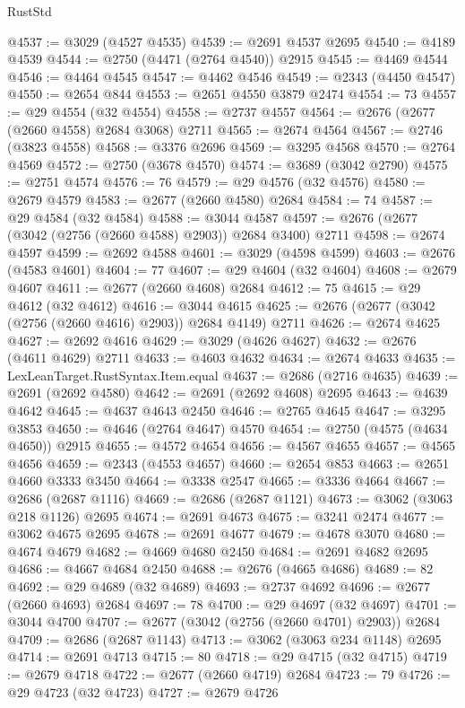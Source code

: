 \begin{lexlean}{RustStd}
\begin{coremodule}
@4537 := @3029 (@4527 @4535)
@4539 := @2691 @4537 @2695
@4540 := @4189 @4539
@4544 := @2750 (@4471 (@2764 @4540)) @2915
@4545 := @4469 @4544
@4546 := @4464 @4545
@4547 := @4462 @4546
@4549 := @2343 (@4450 @4547)
@4550 := @2654 @844
@4553 := @2651 @4550 @3879 @2474
@4554 := 73
@4557 := @29 @4554 (@32 @4554)
@4558 := @2737 @4557
@4564 := @2676 (@2677 (@2660 @4558) @2684 @3068) @2711
@4565 := @2674 @4564
@4567 := @2746 (@3823 @4558)
@4568 := @3376 @2696
@4569 := @3295 @4568
@4570 := @2764 @4569
@4572 := @2750 (@3678 @4570)
@4574 := @3689 (@3042 @2790)
@4575 := @2751 @4574
@4576 := 76
@4579 := @29 @4576 (@32 @4576)
@4580 := @2679 @4579
@4583 := @2677 (@2660 @4580) @2684
@4584 := 74
@4587 := @29 @4584 (@32 @4584)
@4588 := @3044 @4587
@4597 := @2676 (@2677 (@3042 (@2756 (@2660 @4588) @2903)) @2684 @3400) @2711
@4598 := @2674 @4597
@4599 := @2692 @4588
@4601 := @3029 (@4598 @4599)
@4603 := @2676 (@4583 @4601)
@4604 := 77
@4607 := @29 @4604 (@32 @4604)
@4608 := @2679 @4607
@4611 := @2677 (@2660 @4608) @2684
@4612 := 75
@4615 := @29 @4612 (@32 @4612)
@4616 := @3044 @4615
@4625 := @2676 (@2677 (@3042 (@2756 (@2660 @4616) @2903)) @2684 @4149) @2711
@4626 := @2674 @4625
@4627 := @2692 @4616
@4629 := @3029 (@4626 @4627)
@4632 := @2676 (@4611 @4629) @2711
@4633 := @4603 @4632
@4634 := @2674 @4633
@4635 := LexLeanTarget.RustSyntax.Item.equal
@4637 := @2686 (@2716 @4635)
@4639 := @2691 (@2692 @4580)
@4642 := @2691 (@2692 @4608) @2695
@4643 := @4639 @4642
@4645 := @4637 @4643 @2450
@4646 := @2765 @4645
@4647 := @3295 @3853
@4650 := @4646 (@2764 @4647) @4570
@4654 := @2750 (@4575 (@4634 @4650)) @2915
@4655 := @4572 @4654
@4656 := @4567 @4655
@4657 := @4565 @4656
@4659 := @2343 (@4553 @4657)
@4660 := @2654 @853
@4663 := @2651 @4660 @3333 @3450
@4664 := @3338 @2547
@4665 := @3336 @4664
@4667 := @2686 (@2687 @1116)
@4669 := @2686 (@2687 @1121)
@4673 := @3062 (@3063 @218 @1126) @2695
@4674 := @2691 @4673
@4675 := @3241 @2474
@4677 := @3062 @4675 @2695
@4678 := @2691 @4677
@4679 := @4678 @3070
@4680 := @4674 @4679
@4682 := @4669 @4680 @2450
@4684 := @2691 @4682 @2695
@4686 := @4667 @4684 @2450
@4688 := @2676 (@4665 @4686)
@4689 := 82
@4692 := @29 @4689 (@32 @4689)
@4693 := @2737 @4692
@4696 := @2677 (@2660 @4693) @2684
@4697 := 78
@4700 := @29 @4697 (@32 @4697)
@4701 := @3044 @4700
@4707 := @2677 (@3042 (@2756 (@2660 @4701) @2903)) @2684
@4709 := @2686 (@2687 @1143)
@4713 := @3062 (@3063 @234 @1148) @2695
@4714 := @2691 @4713
@4715 := 80
@4718 := @29 @4715 (@32 @4715)
@4719 := @2679 @4718
@4722 := @2677 (@2660 @4719) @2684
@4723 := 79
@4726 := @29 @4723 (@32 @4723)
@4727 := @2679 @4726

\end{coremodule}
\end{lexlean}
